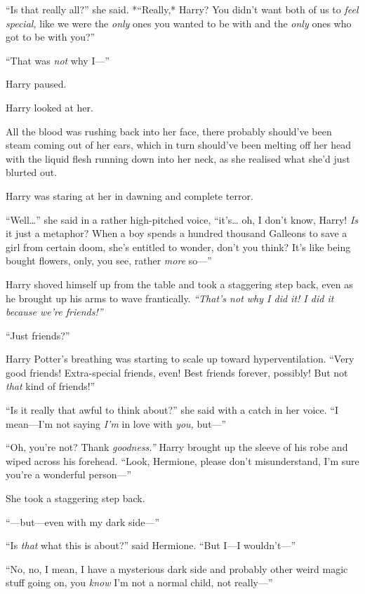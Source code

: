 ``Is that really all?'' she said. *``Really,* Harry? You didn't want
both of us to \emph{feel special,} like we were the \emph{only} ones you
wanted to be with and the \emph{only} ones who got to be with you?''

``That was \emph{not} why I---''

Harry paused.

Harry looked at her.

All the blood was rushing back into her face, there probably should've
been steam coming out of her ears, which in turn should've been melting
off her head with the liquid flesh running down into her neck, as she
realised what she'd just blurted out.

Harry was staring at her in dawning and complete terror.

``Well\ldots{}'' she said in a rather high-pitched voice, ``it's\ldots{}
oh, I don't know, Harry! \emph{Is} it just a metaphor? When a boy spends
a hundred thousand Galleons to save a girl from certain doom, she's
entitled to wonder, don't you think? It's like being bought flowers,
only, you see, rather \emph{more} so---''

Harry shoved himself up from the table and took a staggering step back,
even as he brought up his arms to wave frantically. \emph{``That's not
why I did it! I did it because we're friends!''}

``Just friends?''

Harry Potter's breathing was starting to scale up toward
hyperventilation. ``Very good friends! Extra-special friends, even! Best
friends forever, possibly! But not \emph{that} kind of friends!''

``Is it really that awful to think about?'' she said with a catch in her
voice. ``I mean---I'm not saying \emph{I'm} in love with \emph{you,}
but---''

``Oh, you're not? Thank \emph{goodness.''} Harry brought up the sleeve
of his robe and wiped across his forehead. ``Look, Hermione, please
don't misunderstand, I'm sure you're a wonderful person---''

She took a staggering step back.

``---but---even with my dark side---''

``Is \emph{that} what this is about?'' said Hermione. ``But I---I
wouldn't---''

``No, no, I mean, I have a mysterious dark side and probably other weird
magic stuff going on, you \emph{know} I'm not a normal child, not
really---''

